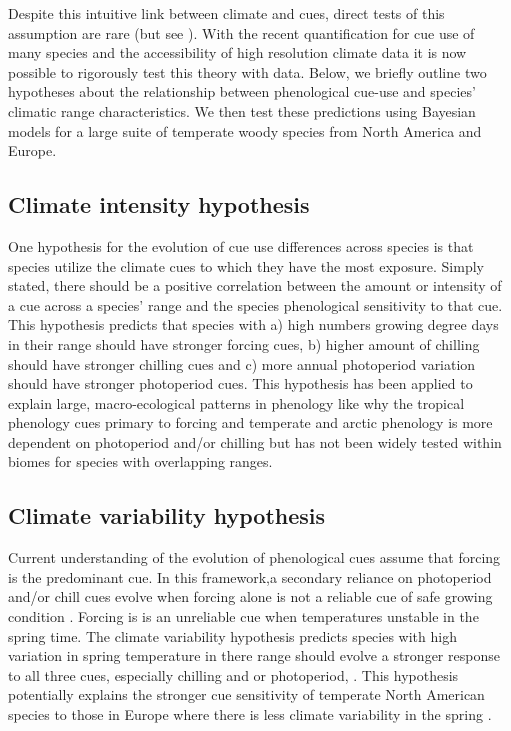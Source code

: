 \documentclass[12pt]{article}\usepackage[]{graphicx}\usepackage[]{color}
\begin{document}
Despite this intuitive link between climate and cues, direct tests of this assumption are rare (but see \citep{Zohner:2017aa}). With the recent quantification for cue use of many species \citep{Ettinger:2020aa} and the accessibility of high resolution climate data it is now possible to rigorously test this theory with data. Below, we briefly outline two hypotheses about the relationship between phenological cue-use and species' climatic range characteristics. We then test these predictions using Bayesian models for a large suite of temperate woody species from North America and Europe.

\subsection{Climate intensity hypothesis}
One hypothesis for the evolution of cue use differences across species is that species utilize the climate cues to which they have the most exposure. Simply stated, there should be a positive correlation between the amount or intensity of a cue across a species' range and the species phenological sensitivity to that cue. This hypothesis predicts that species with  a) high numbers growing degree days in their range should have stronger forcing cues, b) higher amount of chilling should have stronger chilling cues and c) more annual photoperiod variation should have stronger photoperiod cues. This hypothesis has been applied to explain large, macro-ecological patterns in phenology like why the tropical phenology cues primary to forcing and temperate and arctic phenology is more dependent on photoperiod and/or chilling \citep{} but has not been widely tested within biomes for species with overlapping ranges.  

\subsection{Climate variability hypothesis}

Current understanding of the evolution of phenological cues assume that forcing is the predominant cue. In this framework,a secondary reliance on photoperiod and/or chill cues evolve when forcing alone is not a reliable cue of safe growing condition \citep{Korner:2010aa}. Forcing is is an unreliable cue when temperatures unstable in the spring time. The climate variability hypothesis predicts species with high variation in spring temperature in there range should evolve a stronger response to all three cues, especially chilling and or photoperiod,  \citep{Wang:2014aa, Muffler2016}. This hypothesis potentially explains the stronger cue sensitivity of temperate North American species to those in Europe where there is less climate variability in the spring \citep{Zohner:2017aa}.
\end{document}
